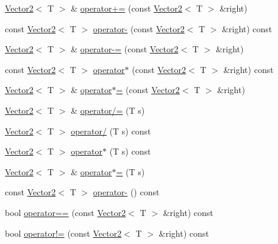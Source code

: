 \begin{DoxyCompactItemize}
\item 
\hyperlink{classastu_1_1Vector2}{Vector2}$<$ T $>$ \& \hyperlink{classastu_1_1Vector2_a285af566f7b2e4a218932094ab9a70f8}{operator+=} (const \hyperlink{classastu_1_1Vector2}{Vector2}$<$ T $>$ \&right)
\item 
const \hyperlink{classastu_1_1Vector2}{Vector2}$<$ T $>$ \hyperlink{classastu_1_1Vector2_a694ff874fcdb2118ed665a7cb28978e9}{operator-\/} (const \hyperlink{classastu_1_1Vector2}{Vector2}$<$ T $>$ \&right) const
\item 
\hyperlink{classastu_1_1Vector2}{Vector2}$<$ T $>$ \& \hyperlink{classastu_1_1Vector2_a7022d1b830ee06d272a05d7d52c93a53}{operator-\/=} (const \hyperlink{classastu_1_1Vector2}{Vector2}$<$ T $>$ \&right)
\item 
const \hyperlink{classastu_1_1Vector2}{Vector2}$<$ T $>$ \hyperlink{classastu_1_1Vector2_a5ee8479488e6da2a82110f2ac62d386f}{operator$\ast$} (const \hyperlink{classastu_1_1Vector2}{Vector2}$<$ T $>$ \&right) const
\item 
\hyperlink{classastu_1_1Vector2}{Vector2}$<$ T $>$ \& \hyperlink{classastu_1_1Vector2_a3416fb656aef7113d0261533f5a8a4aa}{operator$\ast$=} (const \hyperlink{classastu_1_1Vector2}{Vector2}$<$ T $>$ \&right)
\item 
\hyperlink{classastu_1_1Vector2}{Vector2}$<$ T $>$ \& \hyperlink{classastu_1_1Vector2_a9f9362218a0d011032324cbc7a9a85a1}{operator/=} (T s)
\item 
\hyperlink{classastu_1_1Vector2}{Vector2}$<$ T $>$ \hyperlink{classastu_1_1Vector2_af2852a5bb5295f1a510e507bc554863d}{operator/} (T s) const
\item 
\hyperlink{classastu_1_1Vector2}{Vector2}$<$ T $>$ \hyperlink{classastu_1_1Vector2_aa9cd4d74e0174cb0995613f989e42f12}{operator$\ast$} (T s) const
\item 
\hyperlink{classastu_1_1Vector2}{Vector2}$<$ T $>$ \& \hyperlink{classastu_1_1Vector2_a3a4e11dd85fbd0e1cda4e8b38b9aea6a}{operator$\ast$=} (T s)
\item 
const \hyperlink{classastu_1_1Vector2}{Vector2}$<$ T $>$ \hyperlink{classastu_1_1Vector2_aaa65baf8ffd013a0401c4875d91337a4}{operator-\/} () const
\item 
bool \hyperlink{classastu_1_1Vector2_ada7f1d693330e7671cb1f951d8011c08}{operator==} (const \hyperlink{classastu_1_1Vector2}{Vector2}$<$ T $>$ \&right) const
\item 
bool \hyperlink{classastu_1_1Vector2_a01b57021e1b027997ecefb3c9b3595d9}{operator!=} (const \hyperlink{classastu_1_1Vector2}{Vector2}$<$ T $>$ \&right) const
\end{DoxyCompactItemize}
